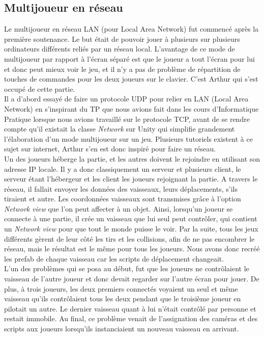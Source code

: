 \documentclass[12pt, titlepage]{article}
\begin{document}
\begin{spacing}{1.5}
\newpage

\subsection{Multijoueur en réseau}

Le multijoueur en réseau LAN (pour Local Area Network) fut commencé après la première soutenance. Le but était de pouvoir jouer à plusieurs sur plusieurs ordinateurs différents reliés par un réseau local. L'avantage de ce mode de multijoueur par rapport à l'écran séparé est que le joueur a tout l'écran pour lui et donc peut mieux voir le jeu, et il n'y a pas de problème de répartition de touches de commandes pour les deux joueurs sur le clavier. C'est Arthur qui s'est occupé de cette partie.\\

Il a d'abord essayé de faire un protocole UDP pour relier en LAN (Local Area Network) en s'inspirant du TP que nous avions fait dans les cours d'Informatique Pratique lorsque nous avions travaillé sur le protocole TCP, avant de se rendre compte qu'il existait la classe \textit{Network} sur Unity qui simplifie grandement l'élaboration d'un mode multijoueur sur un jeu. Plusieurs tutoriels existent à ce sujet sur internet, Arthur s'en est donc inspiré pour faire un réseau.\\

Un des joueurs héberge la partie, et les autres doivent le rejoindre en utilisant son adresse IP locale. Il y a donc classiquement un serveur et plusieurs client, le serveur étant l'hébergeur et les client les joueurs rejoignant la partie. A travers le réseau, il fallait envoyer les données des vaisseaux, leurs déplacements, s'ils tiraient et autre. Les coordonnées vaisseaux sont transmises grâce à l'option \textit{Network view} que l'on peut affecter à un objet. Ainsi, lorsqu'un joueur se connecte à une partie, il crée un vaisseau que lui seul peut contrôler, qui contient un \textit{Network view} pour que tout le monde puisse le voir. Par la suite, tous les jeux différents gèrent de leur côté les tirs et les collisions, afin de ne pas encombrer le réseau, mais le résultat est le même pour tous les joueurs. Nous avons donc recréé les prefab de chaque vaisseau car les scripts de déplacement changeait.\\

L'un des problèmes qui se posa au début, fut que les joueurs ne contrôlaient le vaisseau de l'autre joueur et donc devait regarder sur l'autre écran pour jouer. De plus, à trois joueurs, les deux premiers connectés voyaient un seul et même vaisseau qu'ils contrôlaient tous les deux pendant que le troisième joueur en pilotait un autre. Le dernier vaisseau quant à lui n'était contrôlé par personne et restait immobile. Au final, ce problème venait de l'assignation des caméras et des scripts aux joueurs lorsqu'ils instanciaient un nouveau vaisseau en arrivant.\\


\end{spacing}
\end{document}
